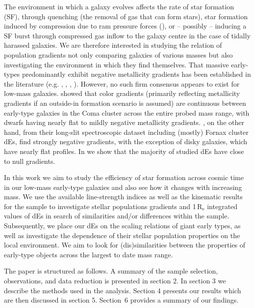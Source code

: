 \documentclass[useAMS,usenatbib]{mn2e}
\newcommand{\re}{$\mathrm{R_e}$}
\begin{document}
The environment in which a galaxy evolves affects the rate of star formation (SF), through quenching (the removal of gas that can form stars), star formation induced by compression due to ram pressure forces (\citealt{tonnesen:2009}), or -- possibly -- inducing a SF burst through compressed gas inflow to the galaxy centre in the case of tidally harassed galaxies. We are therefore interested in studying the relation of population gradients not only comparing galaxies of various masses but also investigating the environment in which they find themselves. That massive early-types predominantly exhibit negative metallicity gradients has been established in the literature (e.g. \citealt{kuntschner:2010}, \citealt{loubser:2012}, \citealt{oliva-Altamirano:2015}, \citealt{wilkinson:2015}). However, no such firm consensus appears to exist for low-mass galaxies. \cite{denbrok:2011} showed that color gradients (primarily reflecting metallicity gradients if an outside-in formation scenario is assumed) are continuous between early-type galaxies in the Coma cluster across the entire probed mass range, with dwarfs having nearly flat to mildly negative metallicity gradients. \cite{koleva:2009b}, on the other hand, from their long-slit spectroscopic dataset including (mostly) Fornax cluster dEs, find strongly negative gradients, with the exception of disky galaxies, which have nearly flat profiles. In \cite{rys:2015} we show that the majority of studied dEs have close to null gradients.  

In this work we aim to study the efficiency of star formation across cosmic time in our low-mass early-type galaxies and also see how it changes with increasing mass. We use the available line-strength indices as well as the kinematic results for the sample to investigate stellar populations gradients and 1\,{\re} integrated values of dEs in search of similarities and/or differences within the sample. Subsequently, we place our dEs on the scaling relations of giant early types, as well as investigate the dependence of their stellar population properties on the local environment. We aim to look for (dis)similarities between the properties of early-type objects across the largest to date mass range.

The paper is structured as follows. A summary of the sample selection, observations, and data reduction is presented in section 2. In section 3 we describe the methods used in the analysis. Section 4 presents our results which are then discussed in section 5. Section~6 provides a summary of our findings.
\end{document}
